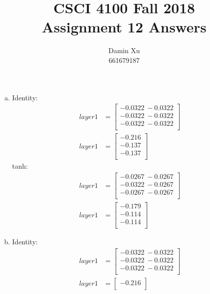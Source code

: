 \documentclass[11pt]{article}
\title{CSCI 4100 Fall 2018 \\
Assignment 12 Answers}
\author{Damin Xu\\661679187}
\begin{document}
\maketitle
\begin{enumerate} [(a)]
	\item Identity:   \begin{align}
    layer 1 &= \begin{bmatrix}
           -0.0322\ -0.0322 \\
           -0.0322\ -0.0322 \\
           -0.0322\ -0.0322 \\
         \end{bmatrix}\\
    layer 1 &= \begin{bmatrix}
           -0.216 \\
           -0.137 \\
           -0.137 \\
         \end{bmatrix}
  \end{align}
  tanh:   \begin{align}
    layer 1 &= \begin{bmatrix}
           -0.0267\ -0.0267 \\
           -0.0322\ -0.0267 \\
           -0.0267\ -0.0267 \\
         \end{bmatrix}\\
    layer 1 &= \begin{bmatrix}
           -0.179 \\
           -0.114 \\
           -0.114 \\
         \end{bmatrix}
  \end{align}
  \newpage
  \item Identity:   \begin{align}
    layer 1 &= \begin{bmatrix}
           -0.0322\ -0.0322 \\
           -0.0322\ -0.0322 \\
           -0.0322\ -0.0322 \\
         \end{bmatrix}\\
    layer 1 &= \begin{bmatrix}
           -0.216 \\

\end{bmatrix}
\end{align}
\end{enumerate}
\end{document}
